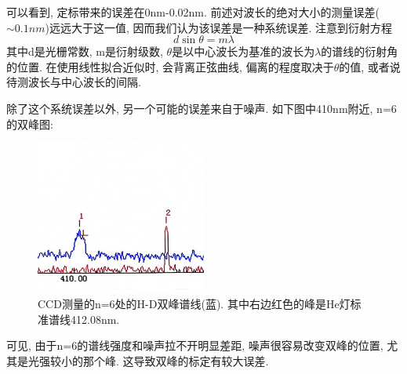 \documentclass[12pt,a4paper]{article}
\begin{document}
可以看到, 定标带来的误差在0nm-0.02nm. 前述对波长的绝对大小的测量误差($\sim 0.1nm$)远远大于这一值, 因而我们认为该误差是一种系统误差. 
注意到衍射方程
\begin{equation}
    d\sin{\theta}=m \lambda
\end{equation}
其中d是光栅常数, m是衍射级数, $\theta$是以中心波长为基准的波长为$\lambda$的谱线的衍射角的位置. 
在使用线性拟合近似时, 会背离正弦曲线, 偏离的程度取决于$\theta$的值, 或者说待测波长与中心波长的间隔. 

除了这个系统误差以外, 另一个可能的误差来自于噪声. 如下图中410nm附近, n=6的双峰图: 
\begin{figure}[H]
    \centering
    \includegraphics[width=0.5\textwidth]{CCD 410.jpg}
    \caption{CCD测量的n=6处的H-D双峰谱线(蓝). 其中右边红色的峰是He灯标准谱线412.08nm. }
\end{figure}
可见, 由于n=6的谱线强度和噪声拉不开明显差距, 噪声很容易改变双峰的位置, 尤其是光强较小的那个峰. 这导致双峰的标定有较大误差.
\end{document}
